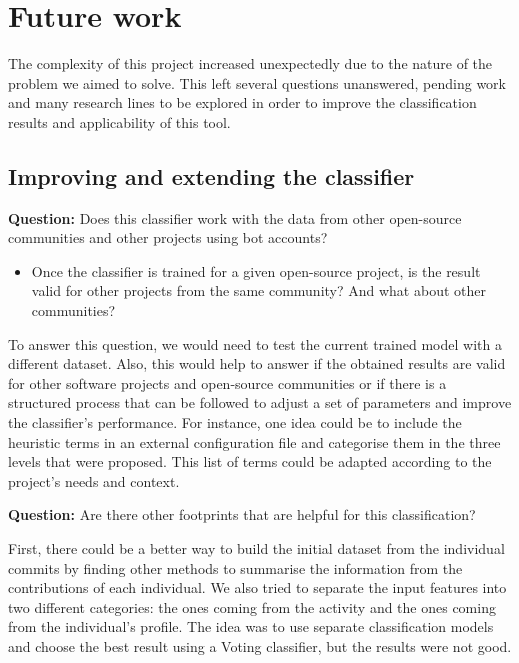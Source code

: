\documentclass[a4paper, 12pt]{book}
\begin{document}
\section{Future work}
\label{sec:future-work}

The complexity of this project increased unexpectedly due to the nature of the problem we aimed to solve. This left several questions unanswered, pending work and many research lines to be explored in order to improve the classification results and applicability of this tool.

\subsection{Improving and extending the classifier}

\textbf{Question:} Does this classifier work with the data from other open-source communities and other projects using bot accounts?

\begin{itemize}
    \item Once the classifier is trained for a given open-source project, is the result valid for other projects from the same community? And what about other communities?
\end{itemize}

To answer this question, we would need to test the current trained model with a different dataset. Also, this would help to answer if the obtained results are valid for other software projects and open-source communities or if there is a structured process that can be followed to adjust a set of parameters and improve the classifier's performance. For instance, one idea could be to include the heuristic terms in an external configuration file and categorise them in the three levels that were proposed. This list of terms could be adapted according to the project's needs and context.

\textbf{Question:} Are there other footprints that are helpful for this classification?

First, there could be a better way to build the initial dataset from the individual commits by finding other methods to summarise the information from the contributions of each individual. We also tried to separate the input features into two different categories: the ones coming from the activity and the ones coming from the individual's profile. The idea was to use separate classification models and choose the best result using a Voting classifier, but the results were not good.
\end{document}
